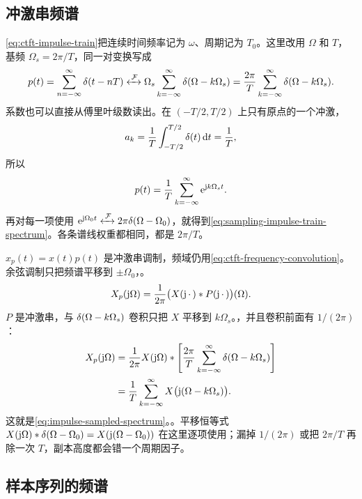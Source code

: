 \subsection{冲激串频谱}
\label{subsec:sampling-impulse-spectrum}

\cref{eq:ctft-impulse-train}把连续时间频率记为 $\omega$、周期记为 $T_0$。这里改用 $\Omega$ 和 $T$，基频 $\Omega_s=2\pi/T$，同一对变换写成
\begin{equation}
  p(t)=\sum_{n=-\infty}^{\infty}\delta(t-nT)
  \mathrel{\xleftrightarrow{\,\mathcal{F}\,}}
  \Omega_s\sum_{k=-\infty}^{\infty}\delta(\Omega-k\Omega_s)
  =\frac{2\pi}{T}\sum_{k=-\infty}^{\infty}\delta(\Omega-k\Omega_s).
  \label{eq:sampling-impulse-train-spectrum}
\end{equation}
系数也可以直接从傅里叶级数读出。在 $(-T/2,T/2)$ 上只有原点的一个冲激，
\[
  a_k=\frac1T\int_{-T/2}^{T/2}\delta(t)\mathop{}\!\mathrm{d} t=\frac1T,
\]
所以
\[
  p(t)=\frac1T\sum_{k=-\infty}^{\infty}\mathrm{e}^{\mathrm{j} k\Omega_s t}.
\]
再对每一项使用 $\mathrm{e}^{\mathrm{j}\Omega_0 t}\mathrel{\xleftrightarrow{\,\mathcal{F}\,}} 2\pi\delta(\Omega-\Omega_0)$，就得到\cref{eq:sampling-impulse-train-spectrum}。各条谱线权重都相同，都是 $2\pi/T$。

$x_p(t)=x(t)p(t)$ 是冲激串调制，频域仍用\cref{eq:ctft-frequency-convolution}。余弦调制只把频谱平移到 $\pm\Omega_0$，。
\[
  X_p(\mathrm{j}\Omega)
  =\frac1{2\pi}\bigl(X(\mathrm{j}\,\cdot\,)\mathbin{\ast} P(\mathrm{j}\,\cdot\,)\bigr)(\Omega).
\]
$P$ 是冲激串，与 $\delta(\Omega-k\Omega_s)$ 卷积只把 $X$ 平移到 $k\Omega_s$。，并且卷积前面有 $1/(2\pi)$：
\begin{align*}
  X_p(\mathrm{j}\Omega)
  &=\frac1{2\pi}X(\mathrm{j}\Omega)
    \mathbin{\ast}\left[\frac{2\pi}{T}
      \sum_{k=-\infty}^{\infty}\delta(\Omega-k\Omega_s)\right]\\
  &=\frac1T\sum_{k=-\infty}^{\infty}
    X\bigl(\mathrm{j}(\Omega-k\Omega_s)\bigr).
\end{align*}
这就是\cref{eq:impulse-sampled-spectrum}。。平移恒等式 $X(\mathrm{j}\Omega)\mathbin{\ast}\delta(\Omega-\Omega_0)=X(\mathrm{j}(\Omega-\Omega_0))$ 在这里逐项使用；漏掉 $1/(2\pi)$ 或把 $2\pi/T$ 再除一次 $T$，副本高度都会错一个周期因子。

\subsection{样本序列的频谱}
\label{subsec:sampling-dtft-link}

